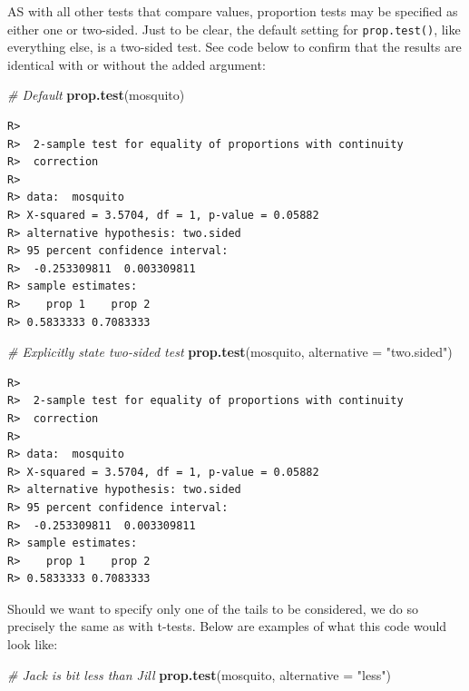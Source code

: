\documentclass[english,10pt,a4paper,oneside]{book}
\newenvironment{Shaded}{\begin{snugshade}}{\end{snugshade}}
\newcommand{\CommentTok}[1]{\textcolor[rgb]{0.56,0.35,0.01}{\textit{#1}}}
\newcommand{\DataTypeTok}[1]{\textcolor[rgb]{0.13,0.29,0.53}{#1}}
\newcommand{\KeywordTok}[1]{\textcolor[rgb]{0.13,0.29,0.53}{\textbf{#1}}}
\newcommand{\NormalTok}[1]{#1}
\newcommand{\StringTok}[1]{\textcolor[rgb]{0.31,0.60,0.02}{#1}}
\theoremstyle{definition}
\theoremstyle{definition}
\theoremstyle{definition}
\theoremstyle{remark}
\begin{document}
AS with all other tests that compare values, proportion tests may be
specified as either one or two-sided. Just to be clear, the default
setting for \texttt{prop.test()}, like everything else, is a two-sided
test. See code below to confirm that the results are identical with or
without the added argument:

\begin{Shaded}
\begin{Highlighting}[]
\CommentTok{# Default}
\KeywordTok{prop.test}\NormalTok{(mosquito)}
\end{Highlighting}
\end{Shaded}

\begin{verbatim}
R> 
R>  2-sample test for equality of proportions with continuity
R>  correction
R> 
R> data:  mosquito
R> X-squared = 3.5704, df = 1, p-value = 0.05882
R> alternative hypothesis: two.sided
R> 95 percent confidence interval:
R>  -0.253309811  0.003309811
R> sample estimates:
R>    prop 1    prop 2 
R> 0.5833333 0.7083333
\end{verbatim}

\begin{Shaded}
\begin{Highlighting}[]
\CommentTok{# Explicitly state two-sided test}
\KeywordTok{prop.test}\NormalTok{(mosquito, }\DataTypeTok{alternative =} \StringTok{"two.sided"}\NormalTok{)}
\end{Highlighting}
\end{Shaded}

\begin{verbatim}
R> 
R>  2-sample test for equality of proportions with continuity
R>  correction
R> 
R> data:  mosquito
R> X-squared = 3.5704, df = 1, p-value = 0.05882
R> alternative hypothesis: two.sided
R> 95 percent confidence interval:
R>  -0.253309811  0.003309811
R> sample estimates:
R>    prop 1    prop 2 
R> 0.5833333 0.7083333
\end{verbatim}

Should we want to specify only one of the tails to be considered, we do
so precisely the same as with t-tests. Below are examples of what this
code would look like:

\begin{Shaded}
\begin{Highlighting}[]
\CommentTok{# Jack is bit less than Jill}
\KeywordTok{prop.test}\NormalTok{(mosquito, }\DataTypeTok{alternative =} \StringTok{"less"}\NormalTok{)}
\end{Highlighting}
\end{Shaded}
\end{document}
